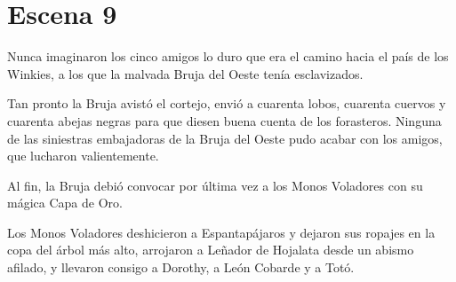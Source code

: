 \chapter{Escena 9}
Nunca imaginaron los cinco amigos lo duro que era el camino hacia el país de los Winkies, a los que la malvada Bruja del Oeste tenía esclavizados.

Tan pronto la Bruja avistó el cortejo, envió a cuarenta lobos, cuarenta cuervos y cuarenta abejas negras para que diesen buena cuenta de los forasteros. Ninguna de las siniestras embajadoras de la Bruja del Oeste pudo acabar con los amigos, que lucharon valientemente.

Al fin, la Bruja debió convocar por última vez a los Monos Voladores con su mágica Capa de Oro.

Los Monos Voladores deshicieron a Espantapájaros y dejaron sus ropajes en la copa del árbol más alto, arrojaron a Leñador de Hojalata desde un abismo afilado, y llevaron consigo a Dorothy, a León Cobarde y a Totó.